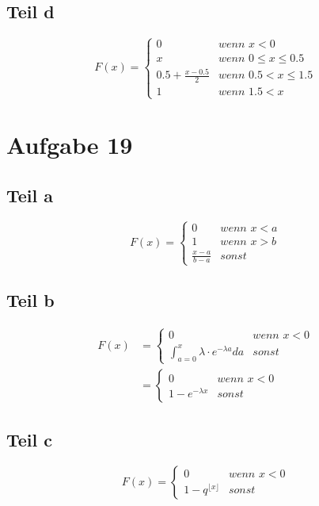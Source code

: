 \documentclass[10pt,a4paper]{article}
\begin{document}
\subsection{Teil d}
\begin{equation}
  F(x) = 
  \begin{cases}
    0 & \textit{wenn $x < 0$}\\
    x & \textit{wenn $0 \le x \le 0.5$}\\
    0.5 + \frac{x - 0.5}{2} & \textit{wenn $0.5 < x \le 1.5$}\\
    1 & \textit{wenn $1.5 < x$}
  \end{cases}
\end{equation}

\section{Aufgabe 19}

\subsection{Teil a}
\begin{equation}
  F(x) = 
  \begin{cases}
    0 & \textit{wenn $x < a$}\\
    1 & \textit{wenn $x > b$}\\
    \frac{x - a}{b - a} & \textit{sonst}
  \end{cases}
\end{equation}

\subsection{Teil b}
\begin{align*}
  F(x) & = 
  \begin{cases}
    0 & \textit{wenn $x < 0$}\\
    \int_{a = 0}^{x} \lambda \cdot e^{-\lambda a} da & \textit{sonst}
  \end{cases}\\
  & = 
  \begin{cases}
    0 & \textit{wenn $x < 0$}\\
    1 - e^{-\lambda x} & \textit{sonst}
  \end{cases}
\end{align*}

\subsection{Teil c}
\begin{equation}
  F(x) = 
  \begin{cases}
    0 & \textit{wenn $x < 0$}\\
    1 - q^{\lfloor x \rfloor} & \textit{sonst}
  \end{cases}
\end{equation}
\end{document}
